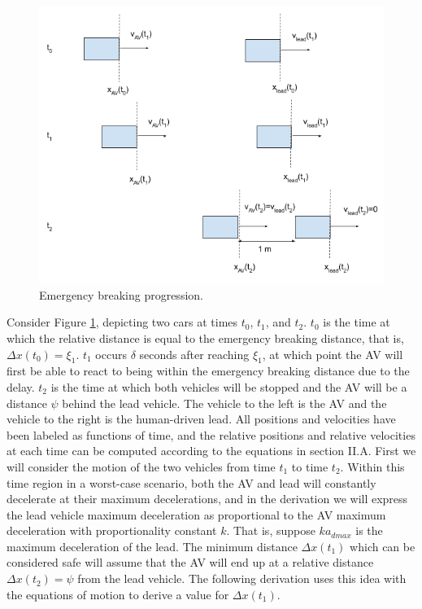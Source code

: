 \documentclass[conference]{IEEEtran}
\begin{document}
\begin{appendix}
\begin{figure}[htbp]
\centerline{\includegraphics[width=6 in]{xiDerivation.PNG}}
\caption{Emergency breaking progression.}
\label{fig2}
\end{figure}

Consider Figure \ref{fig2}, depicting two cars at times $t_0$, $t_1$, and $t_2$. $t_0$ is the time at which the relative distance is equal to the emergency breaking distance, that is, $\Delta x(t_0)=\xi_1$. $t_1$ occurs $\delta$ seconds after reaching $\xi_1$, at which point the AV will first be able to react to being within the emergency breaking distance due to the delay. $t_2$ is the time at which both vehicles will be stopped and the AV will be a distance $\psi$ behind the lead vehicle. The vehicle to the left is the AV and the vehicle to the right is the human-driven lead. All positions and velocities have been labeled as functions of time, and the relative positions and relative velocities at each time can be computed according to the equations in section II.A. First we will consider the motion of the two vehicles from time $t_1$ to time $t_2$. Within this time region in a worst-case scenario, both the AV and lead will constantly decelerate at their maximum decelerations, and in the derivation we will express the lead vehicle maximum deceleration as proportional to the AV maximum deceleration with proportionality constant $k$. That is, suppose $ka_{dmax}$ is the maximum deceleration of the lead. The minimum distance $\Delta x(t_1)$ which can be considered safe will assume that the AV will end up at a relative distance $\Delta x(t_2)= \psi$ from the lead vehicle. The following derivation uses this idea with the equations of motion to derive a value for $\Delta x(t_1)$.


\end{appendix}
\end{document}
